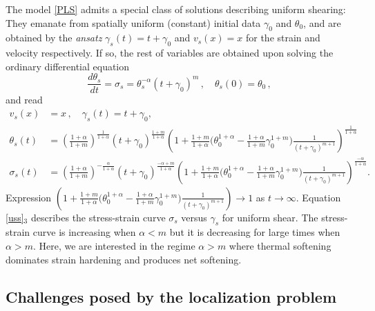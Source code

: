 \documentclass[a4paper,11pt]{article}
\theoremstyle{remark}
\begin{document}
The model \eqref{PLS} admits  a special class of solutions describing uniform shearing: They emanate
from spatially uniform (constant) initial data $\gamma_0$ and $\theta_0$, and are obtained by the {\it ansatz} $\gamma_s (t) = t + \gamma_0 $ and $v_s (x) = x$ 
for the strain and velocity respectively. If so, the rest of variables are obtained 
upon solving the ordinary differential equation
\begin{equation}
\label{uss2}
\frac{d \theta_s }{dt} = \sigma_s = \theta_s^{-\alpha} (t + \gamma_0)^m \, , \quad \theta_s(0) = \theta_0 \, ,
\end{equation}
and read
\begin{equation} \label{uss}
\begin{aligned}
v_s (x)  &=x \, ,   \quad  \gamma_s(t) = t+\gamma_0,  \quad 
\\
\theta_s(t) &=  \left( \tfrac{1+\alpha}{1+m }\right )^{\frac{1}{1+\alpha}}  (t+\gamma_0)^{\frac{1 + m}{1+\alpha}} 
 \left( 1 +  \tfrac{1+m}{1+\alpha} \big (  \theta_0^{1+\alpha}  - \tfrac{1+\alpha}{1+m} \gamma_0^{1+m} \big ) \tfrac{1}{(t+\gamma_0)^{m+1}}  \right)^{\frac{1}{1+\alpha}}
 \\
  \sigma_s(t)&=
   \left( \tfrac{1+\alpha}{1+m}\right )^{-\frac{\alpha}{1+\alpha}}  (t+\gamma_0)^{\frac{-\alpha + m}{1+\alpha}}  
   \left( 1 +  \tfrac{1+m}{1+\alpha} \big (  \theta_0^{1+\alpha}  - \tfrac{1+\alpha}{1+m} \gamma_0^{1+m} \big ) \tfrac{1}{(t+\gamma_0)^{m+1}}  \right)^{\frac{-\alpha}{1+\alpha}} .
\end{aligned}
\end{equation}
Expression $\left( 1 +  \tfrac{1+m}{1+\alpha} \big (  \theta_0^{1+\alpha}  - \tfrac{1+\alpha}{1+m} \gamma_0^{1+m} \big ) \tfrac{1}{(t+\gamma_0)^{m+1}}  \right) \rightarrow 1$ as $t \rightarrow\infty$.
Equation \eqref{uss}$_3$ describes the stress-strain curve $\sigma_s$ versus $\gamma_s$ for uniform shear.
The stress-strain curve is increasing when $\alpha < m$ but it is decreasing for large times when $\alpha > m$.
Here, we are interested in the regime $\alpha > m$ where thermal softening dominates strain hardening and produces net softening.



\subsection{Challenges posed by the localization problem}
\label{sec:challenges}
\end{document}
